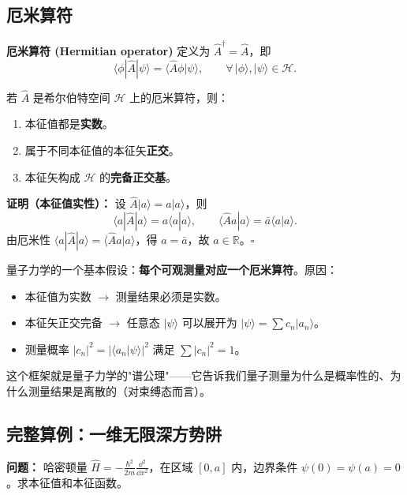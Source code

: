 \subsection{厄米算符}

\textbf{厄米算符 (Hermitian operator)} 定义为 $\hat{A}^\dagger = \hat{A}$，即
\[
\langle\phi|\hat{A}|\psi\rangle = \langle\hat{A}\phi|\psi\rangle,\qquad
\forall\,|\phi\rangle,|\psi\rangle\in\mathcal{H}.
\]

\begin{theorem}
若 $\hat{A}$ 是希尔伯特空间 $\mathcal{H}$ 上的厄米算符，则：
\begin{enumerate}
  \item 本征值都是\textbf{实数}。
  \item 属于不同本征值的本征矢\textbf{正交}。
  \item 本征矢构成 $\mathcal{H}$ 的\textbf{完备正交基}。
\end{enumerate}
\end{theorem}

\textbf{证明（本征值实性）：}
设 $\hat{A}|a\rangle = a|a\rangle$，则
\[
\langle a|\hat{A}|a\rangle = a\langle a|a\rangle,\qquad
\langle\hat{A}a|a\rangle = \bar{a}\langle a|a\rangle.
\]
由厄米性 $\langle a|\hat{A}|a\rangle = \langle\hat{A}a|a\rangle$，得 $a = \bar{a}$，故 $a\in\mathbb{R}$。$\square$

\begin{insight}[厄米算符 = 可观测量]
量子力学的一个基本假设：\textbf{每个可观测量对应一个厄米算符}。原因：
\begin{itemize}
  \item 本征值为实数 $\to$ 测量结果必须是实数。
  \item 本征矢正交完备 $\to$ 任意态 $|\psi\rangle$ 可以展开为 $|\psi\rangle = \sum c_n|a_n\rangle$。
  \item 测量概率 $|c_n|^2 = |\langle a_n|\psi\rangle|^2$ 满足 $\sum|c_n|^2 = 1$。
\end{itemize}
这个框架就是量子力学的"谱公理"——它告诉我们量子测量为什么是概率性的、为什么测量结果是离散的（对束缚态而言）。
\end{insight}

\subsection{完整算例：一维无限深方势阱}

\textbf{问题：} 哈密顿量 $\hat{H} = -\frac{\hbar^2}{2m}\frac{\dd^2}{\dd x^2}$，在区域 $[0,a]$ 内，边界条件 $\psi(0)=\psi(a)=0$。求本征值和本征函数。

